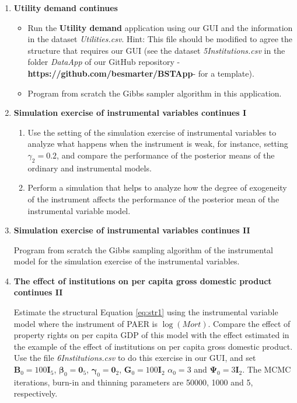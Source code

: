 \begin{enumerate}
\item \textbf{Utility demand continues}

\begin{itemize}
	\item Run the \textbf{Utility demand} application using our GUI and the information in the dataset \textit{Utilities.csv}. Hint: This file should be modified to agree the structure that requires our GUI (see the dataset \textit{5Institutions.csv} in the folder \textit{DataApp} of our GitHub repository -\textbf{https://github.com/besmarter/BSTApp}- for a template).
	\item Program from scratch the Gibbs sampler algorithm in this application.   
\end{itemize}

\item \textbf{Simulation exercise of instrumental variables continues I}

\begin{enumerate}
	\item Use the setting of the simulation exercise of instrumental variables to analyze what happens when the instrument is weak, for instance, setting $\gamma_2=0.2$, and compare the performance of the posterior means of the ordinary and instrumental models.
	\item Perform a simulation that helps to analyze how the degree of exogeneity of the instrument affects the performance of the posterior mean of the instrumental variable model.	 
\end{enumerate}

\item \textbf{Simulation exercise of instrumental variables continues II}

Program from scratch the Gibbs sampling algorithm of the instrumental model for the simulation exercise of the instrumental variables.

\item \textbf{The effect of institutions on per capita gross domestic product continues II}

Estimate the structural Equation \ref{eq:str1} using the instrumental variable model where the instrument of PAER is $\log(\textit{Mort})$. Compare the effect of property rights on per capita GDP of this model with the effect estimated in the example of the effect of institutions on per capita gross domestic product. Use the file \textit{6Institutions.csv} to do this exercise in our GUI, and set $\bm{B}_0=100\bm{I}_5$, $\bm{\beta}_0=\bm{0}_5$, $\bm{\gamma}_0=\bm{0}_2$, $\bm{G}_0=100\bm{I}_2$ $\alpha_0=3$ and $\bm{\Psi}_0=3\bm{I}_2$. The MCMC iterations, burn-in and thinning parameters are 50000, 1000 and 5, respectively. 

\end{enumerate}


